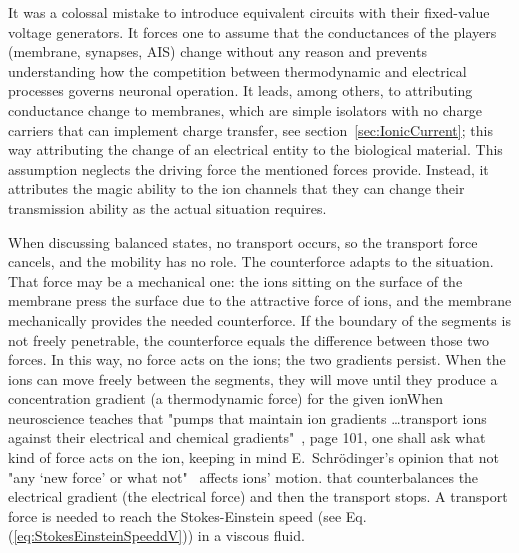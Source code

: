 It was a colossal mistake to introduce equivalent circuits with their fixed-value voltage generators. It forces one to assume that the 
conductances of the players (membrane, synapses, \gls{AIS}) 
change 
without any reason and prevents understanding how the competition between thermodynamic and electrical processes governs neuronal operation.
It leads, among others, to attributing conductance change to membranes, which are simple isolators with no charge carriers that can implement
charge transfer, see section~\ref{sec:IonicCurrent}; this way
attributing the change of an electrical entity to the biological material.
This assumption neglects the driving force the mentioned forces provide. 
Instead, it attributes the magic ability to the ion channels that they
can change their transmission ability as the actual situation requires.

When discussing balanced states, no transport occurs, so the transport force cancels, and the mobility has no role. The counterforce adapts to the situation.
 That force may be a mechanical one:
the ions sitting on the surface of the membrane press the
surface due to the attractive force of ions, and the membrane mechanically provides the needed 
counterforce. 
If the boundary of the segments is not freely penetrable, the counterforce equals the difference between 
those two forces. In this way, no force acts on the ions; the two gradients persist. When the ions can move freely between the segments, they will move until they produce a concentration gradient (a thermodynamic force) for the given ionWhen neuroscience teaches that "pumps that maintain
ion gradients \dots transport ions against their
electrical and chemical gradients"~\cite{PrinciplesNeuralScience:2013}, page 101, one shall ask what kind of force acts on the ion, keeping in mind
E.~Schrödinger's opinion that not "any ‘new force’ or what not"~\cite{Schrodinger:1992} affects ions' motion.
 that counterbalances the electrical gradient (the electrical force)
and then the transport stops. A transport force is needed to reach the Stokes-Einstein speed (see Eq.(\ref{eq:StokesEinsteinSpeeddV})) in a viscous fluid.

